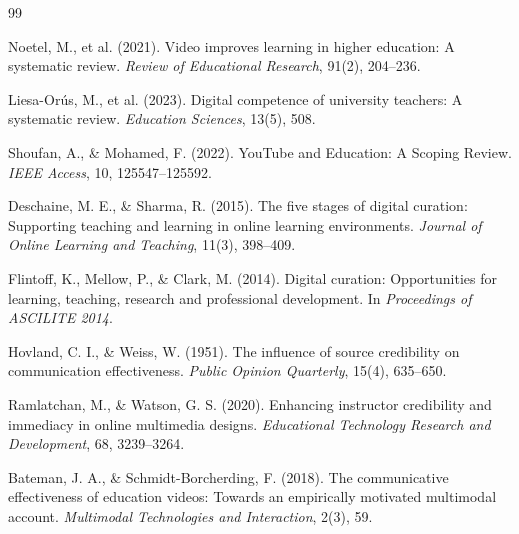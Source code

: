 \documentclass[a4paper,11pt]{article}
\begin{document}
\begin{thebibliography}{99}

Noetel, M., et al. (2021).
Video improves learning in higher education: A systematic review.
\textit{Review of Educational Research}, 91(2), 204--236.

Liesa-Orús, M., et al. (2023).
Digital competence of university teachers: A systematic review.
\textit{Education Sciences}, 13(5), 508.

Shoufan, A., \& Mohamed, F. (2022).
YouTube and Education: A Scoping Review.
\textit{IEEE Access}, 10, 125547--125592.

Deschaine, M. E., \& Sharma, R. (2015).
The five stages of digital curation: Supporting teaching and learning in online learning environments.
\textit{Journal of Online Learning and Teaching}, 11(3), 398--409.

Flintoff, K., Mellow, P., \& Clark, M. (2014).
Digital curation: Opportunities for learning, teaching, research and professional development.
In \textit{Proceedings of ASCILITE 2014}.

Hovland, C. I., \& Weiss, W. (1951).
The influence of source credibility on communication effectiveness.
\textit{Public Opinion Quarterly}, 15(4), 635--650.

Ramlatchan, M., \& Watson, G. S. (2020).
Enhancing instructor credibility and immediacy in online multimedia designs.
\textit{Educational Technology Research and Development}, 68, 3239--3264.

Bateman, J. A., \& Schmidt-Borcherding, F. (2018).
The communicative effectiveness of education videos:
Towards an empirically motivated multimodal account.
\textit{Multimodal Technologies and Interaction}, 2(3), 59.

\end{thebibliography}
\end{document}
